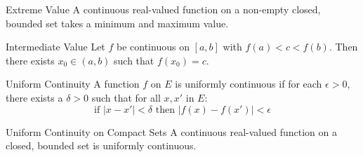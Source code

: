 \begin{theorembox}{Extreme Value}
A continuous real-valued function on a non-empty closed, bounded set takes a minimum and maximum value.
\end{theorembox}

\begin{theorembox}{Intermediate Value}
Let $f$ be continuous on $[a,b]$ with $f(a) < c < f(b)$. Then there exists $x_0 \in (a,b)$ such that $f(x_0) = c$.
\end{theorembox}

\begin{definitionbox}{Uniform Continuity}
A function $f$ on $E$ is uniformly continuous if for each $\epsilon > 0$, there exists a $\delta > 0$ such that for all $x,x'$ in $E$:
\[ \text{if } |x-x'| < \delta \text{ then } |f(x)-f(x')| < \epsilon \]
\end{definitionbox}

\begin{theorembox}{Uniform Continuity on Compact Sets}
A continuous real-valued function on a closed, bounded set is uniformly continuous.
\end{theorembox} 